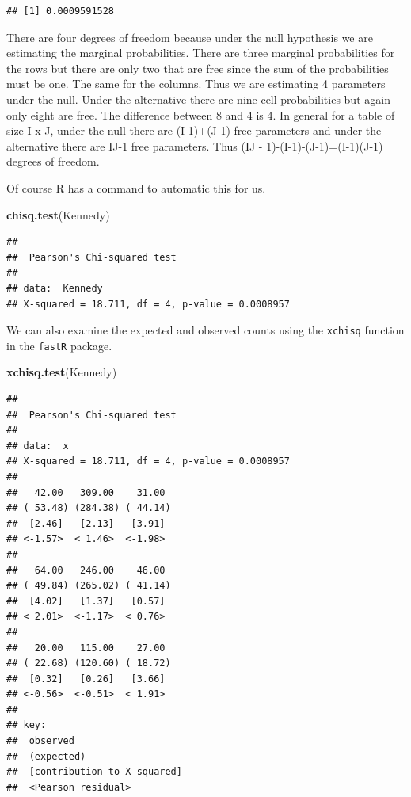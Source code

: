 \documentclass[]{book}
\newenvironment{Shaded}{\begin{snugshade}}{\end{snugshade}}
\newcommand{\KeywordTok}[1]{\textcolor[rgb]{0.13,0.29,0.53}{\textbf{#1}}}
\newcommand{\NormalTok}[1]{#1}
\theoremstyle{definition}
\theoremstyle{definition}
\theoremstyle{definition}
\theoremstyle{remark}
\begin{document}
\begin{verbatim}
## [1] 0.0009591528
\end{verbatim}

There are four degrees of freedom because under the null hypothesis we
are estimating the marginal probabilities. There are three marginal
probabilities for the rows but there are only two that are free since
the sum of the probabilities must be one. The same for the columns. Thus
we are estimating 4 parameters under the null. Under the alternative
there are nine cell probabilities but again only eight are free. The
difference between 8 and 4 is 4. In general for a table of size I x J,
under the null there are (I-1)+(J-1) free parameters and under the
alternative there are IJ-1 free parameters. Thus (IJ -
1)-(I-1)-(J-1)=(I-1)(J-1) degrees of freedom.

Of course R has a command to automatic this for us.

\begin{Shaded}
\begin{Highlighting}[]
\KeywordTok{chisq.test}\NormalTok{(Kennedy)}
\end{Highlighting}
\end{Shaded}

\begin{verbatim}
## 
##  Pearson's Chi-squared test
## 
## data:  Kennedy
## X-squared = 18.711, df = 4, p-value = 0.0008957
\end{verbatim}

We can also examine the expected and observed counts using the
\texttt{xchisq} function in the \texttt{fastR} package.

\begin{Shaded}
\begin{Highlighting}[]
\KeywordTok{xchisq.test}\NormalTok{(Kennedy)}
\end{Highlighting}
\end{Shaded}

\begin{verbatim}
## 
##  Pearson's Chi-squared test
## 
## data:  x
## X-squared = 18.711, df = 4, p-value = 0.0008957
## 
##   42.00   309.00    31.00 
## ( 53.48) (284.38) ( 44.14)
##  [2.46]   [2.13]   [3.91] 
## <-1.57>  < 1.46>  <-1.98> 
##      
##   64.00   246.00    46.00 
## ( 49.84) (265.02) ( 41.14)
##  [4.02]   [1.37]   [0.57] 
## < 2.01>  <-1.17>  < 0.76> 
##      
##   20.00   115.00    27.00 
## ( 22.68) (120.60) ( 18.72)
##  [0.32]   [0.26]   [3.66] 
## <-0.56>  <-0.51>  < 1.91> 
##      
## key:
##  observed
##  (expected)
##  [contribution to X-squared]
##  <Pearson residual>
\end{verbatim}
\end{document}
